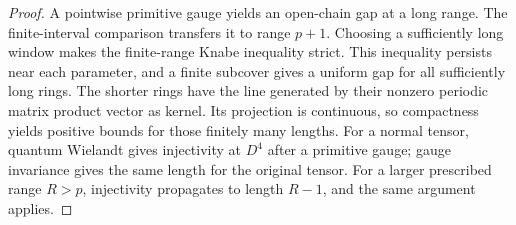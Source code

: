 \begin{proof}
    \leanok
    A pointwise primitive gauge yields an open-chain gap at a long range.
    The finite-interval comparison transfers it to range $p+1$. Choosing
    a sufficiently long window makes the finite-range Knabe inequality
    strict. This inequality persists near each parameter, and a finite
    subcover gives a uniform gap for all sufficiently long rings.
    The shorter rings have the line generated by their nonzero periodic
    matrix product vector as kernel. Its projection is continuous, so
    compactness yields positive bounds for those finitely many lengths.
    For a normal tensor, quantum Wielandt gives injectivity at $D^4$ after
    a primitive gauge; gauge invariance gives the same length for the
    original tensor. For a larger prescribed range $R>p$, injectivity
    propagates to length $R-1$, and the same argument applies.
\end{proof}


